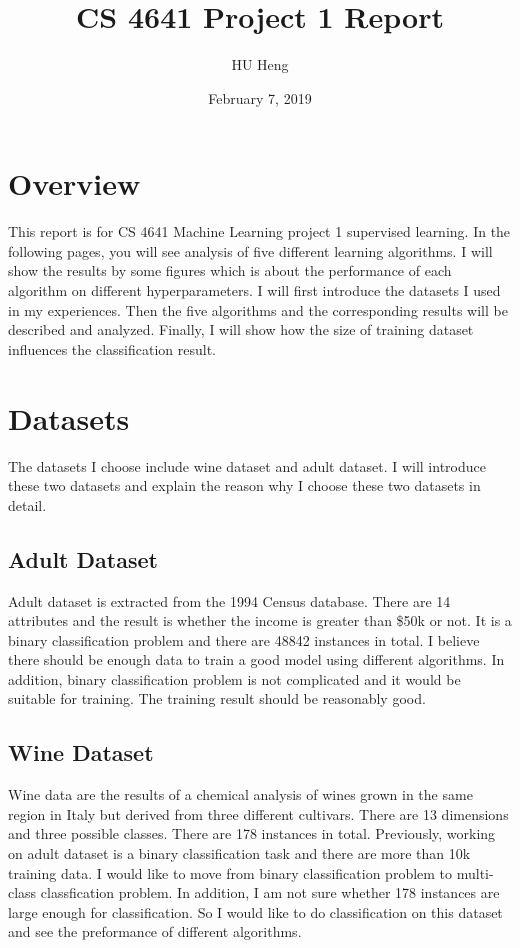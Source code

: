\documentclass[11pt]{article}
\title{CS 4641 Project 1 Report}
\author{HU Heng}
\date{February 7, 2019}
\begin{document}
\maketitle
\section{Overview}
This report is for CS 4641 Machine Learning project 1 supervised learning. In the following pages, you will see analysis of five different learning algorithms. I will show the results by some figures which is about the performance of each algorithm on different hyperparameters. I will first introduce the datasets I used in my experiences. Then the five algorithms and the corresponding results will be described and analyzed. Finally, I will show how the size of training dataset influences the classification result.

\section{Datasets}
The datasets I choose include wine dataset and adult dataset. I will introduce these two datasets and explain the reason why I choose these two datasets in detail.

\subsection{Adult Dataset}
Adult dataset is extracted from the 1994 Census database. There are 14 attributes and the result is whether the income is greater than \$50k or not. It is a binary classification problem and there are 48842 instances in total. I believe there should be enough data to train a good model using different algorithms. In addition, binary classification problem is not complicated and it would be suitable for training. The training result should be reasonably good.

\subsection{Wine Dataset}
Wine data are the results of a chemical analysis of wines grown in the same region in Italy but derived from three different cultivars. There are 13 dimensions and three possible classes. There are 178 instances in total. Previously, working on adult dataset is a binary classification task and there are more than 10k training data. I would like to move from binary classification problem to multi-class classfication problem. In addition, I am not sure whether 178 instances are large enough for classification. So I would like to do classification on this dataset and see the preformance of different algorithms.
\end{document}
